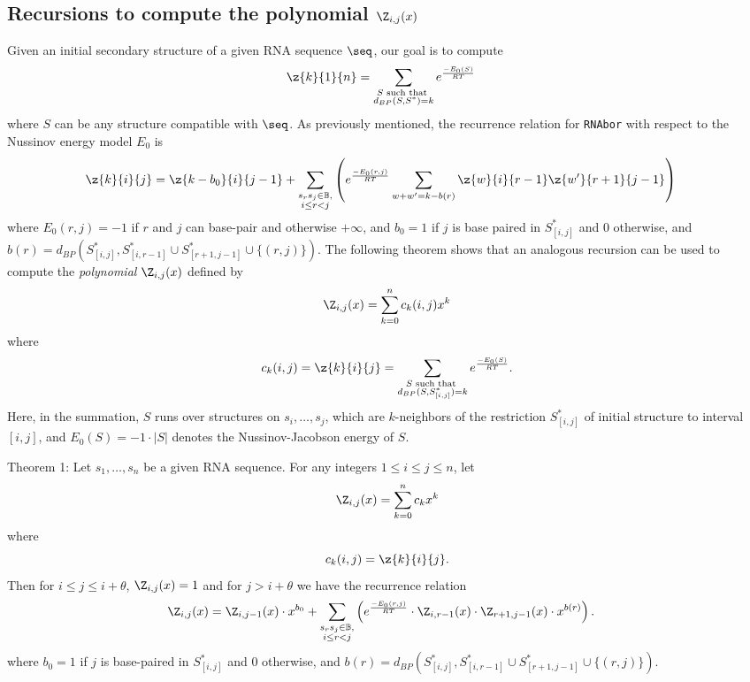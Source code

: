 \subsection*{Recursions to compute the polynomial $\Z_{i,j}(x)$}
\label{section:recursionsForPolynomialZij}

Given an initial secondary structure \strSt of a
given RNA sequence $\seq$, our goal is to compute
\begin{align}
\label{eq:defZk}
\z{k}{1}{n} &= \sum_{\substack{S \text{ such that }\\ d_{BP}(S,S^*)=k}}
e^{\frac{-E_0(S)}{RT}}
\end{align}
where $S$ can be any structure compatible with $\seq$.
As previously mentioned, the recurrence relation for {\tt RNAbor}
with respect to the Nussinov energy model $E_0$ is
\begin{align}
\label{eq:RNAborNussRecursion}
\z{k}{i}{j} &= \z{k-b_0}{i}{j-1} + \sum_{\substack{s_r s_j \in \mathbb{B},\\i\le r<j}}\left(e^{\frac{-E_0(r,j)}{RT}}\sum_{w+w'=k-b(r)}
\z{w}{i}{r-1}  \z{w'}{r+1}{j-1} \right)
\end{align}
where $E_0(r,j)=-1$ if $r$ and $j$ can base-pair and otherwise
$+\infty$, and
$b_0 = 1$ if $j$ is base paired in $S^*_{[i,j]}$ and $0$ otherwise, and
$b(r)=d_{BP}(S^*_{[i,j]}, S^*_{[i,r-1]} \cup S^*_{[r+1,j-1]} \cup\{(r,j)\})$.
The following theorem shows that an analogous recursion can be used to compute
the {\em polynomial} $\Z_{i,j}(x)$ defined by
\begin{eqnarray}
\label{eq:defZijpolynomial}
\Z_{i,j}(x) = \sum_{k=0}^n c_k(i,j) x^k
\end{eqnarray}
where
\[ c_k(i,j)= \z{k}{i}{j} =
\sum_{\substack{S \text{ such that }\\ d_{BP}(S,S^*_{[i,j]})=k}}
e^{\frac{-E_0(S)}{RT}}.
\]
Here, in the summation, $S$ runs over structures on $s_i,\ldots,s_j$, which
are $k$-neighbors of the restriction $S^*_{[i,j]}$ of initial structure
\strSt to interval $[i,j]$, and
$E_0(S)=-1 \cdot |S|$ denotes the Nussinov-Jacobson energy of $S$.
\medskip

\noindent
{\sc Theorem 1:} Let $s_1,\ldots,s_n$ be a given RNA sequence.
For any integers $1 \leq i \leq j \leq n$, let
\begin{eqnarray*}
\Z_{i,j}(x) = \sum_{k=0}^n c_k x^k
\end{eqnarray*}
where
\[ c_k(i,j)= \z{k}{i}{j}.
\]
Then  for $i\leq j \leq i+\theta$, $\Z_{i,j}(x)=1$ and for
$j>i+\theta$ we have the recurrence relation
\begin{eqnarray}
\label{eq:polynomialRecursionNussJac}
\Z_{i,j}(x) &= \Z_{i,j-1}(x) \cdot x^{b_0} +
\sum_{\substack{s_r s_j \in \mathbb{B},\\i\le r<j}}
\left(e^{\frac{-E_0(r,j)}{RT}}\cdot
\Z_{i,r-1}(x)\cdot\Z_{r+1,j-1}(x)\cdot x^{b(r)} \right).
\end{eqnarray}
\medskip
where $b_0 = 1$ if $j$ is base-paired in $S^*_{[i,j]}$ and $0$ otherwise, and
$b(r)=d_{BP}(S^*_{[i,j]}, S^*_{[i,r-1]} \cup S^*_{[r+1,j-1]} \cup\{(r,j)\})$.

